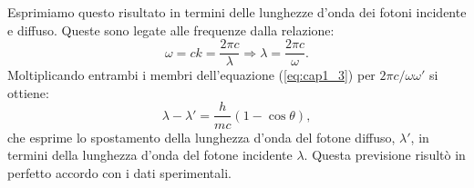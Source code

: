 \documentclass[a4paper,12pt,oneside]{book}
\begin{document}
\begin{center}
\end{center}

Esprimiamo questo risultato in termini delle lunghezze d'onda dei fotoni incidente e diffuso. Queste sono legate alle frequenze dalla relazione:
	\begin{equation}
		\omega = c k =\frac{2 \pi c}{\lambda} \Rightarrow \boxed{\lambda =\frac{2 \pi c}{\omega}.}
	\end{equation}
Moltiplicando entrambi i membri dell'equazione (\ref{eq:cap1_3}) per $2 \pi c / \omega \omega '$ si ottiene:
	\begin{equation}
		\boxed{\boxed{
			\lambda - \lambda ' =\frac{h}{mc}\left( 1-\cos \theta \right),
			}}
	\end{equation}
che esprime lo spostamento della lunghezza d'onda del fotone diffuso, $\lambda ' $, in termini della lunghezza d'onda del fotone incidente $\lambda$. Questa previsione risultò in perfetto accordo con i dati sperimentali.\\
\end{document}

